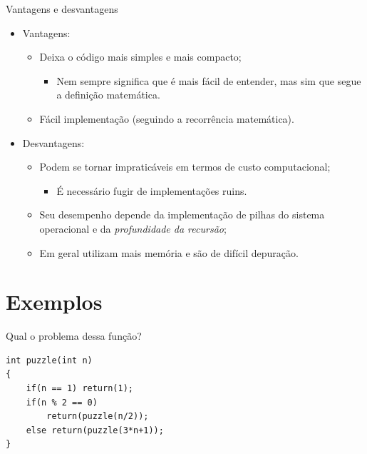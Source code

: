 \documentclass{beamer}
\begin{document}
	\begin{frame}[c]{Vantagens e desvantagens}
		\begin{itemize}
			\item Vantagens:
			\begin{itemize}
				\item Deixa o código mais simples e mais compacto;
				\begin{itemize}
					\item Nem sempre significa que é mais fácil de entender, mas sim que segue a definição matemática.
				\end{itemize}
				\item Fácil implementação (seguindo a recorrência matemática).
			\end{itemize}
			\item Desvantagens:
			\begin{itemize}
				\item Podem se tornar impraticáveis em termos de custo computacional;
				\begin{itemize}
					\item É necessário fugir de implementações ruins.
				\end{itemize}
				\item Seu desempenho depende da implementação de pilhas do sistema operacional e da \textit{profundidade da recursão};
				\item Em geral utilizam mais memória e são de difícil depuração.
			\end{itemize}
		\end{itemize}
	\end{frame}
	
	\section{Exemplos}

	\begin{frame}[fragile, c]{Qual o problema dessa função?}
		\begin{verbatim}
int puzzle(int n)
{
	if(n == 1) return(1);
	if(n % 2 == 0)
		return(puzzle(n/2));
	else return(puzzle(3*n+1));
}
		\end{verbatim}
	\end{frame}
\end{document}
